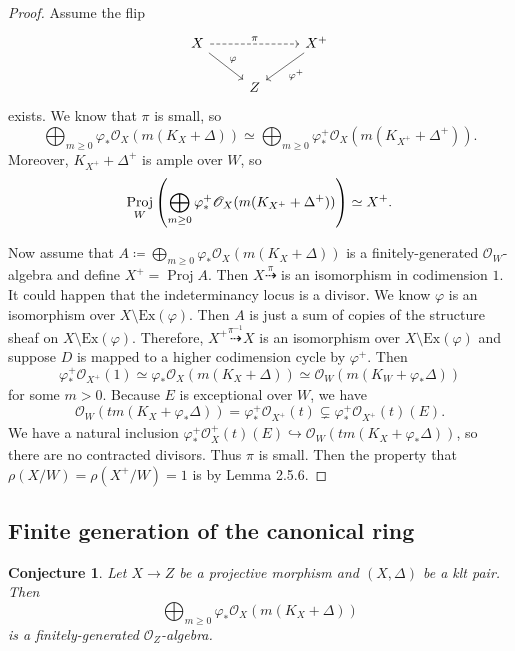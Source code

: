 \documentclass[leqno, openany]{memoir}
\newtheorem{conj}[thm]{Conjecture}
\theoremstyle{definition}
\theoremstyle{remark}
\theoremstyle{plain}
\theoremstyle{definition}
\theoremstyle{remark}
\newcommand{\msc}[1]{\mathscr{#1}}
\newcommand{\mr}[1]{\mathrm{#1}}
\DeclareMathOperator{\Proj}{Proj}
\begin{document}
\begin{proof}
    Assume the flip
    \begin{equation*}
    \begin{tikzcd}
        X \ar[dashrightarrow]{rr}{\pi} \ar{dr}{\varphi} & & X^+ \ar{dl}{\varphi^+} \\
                                                        & Z
    \end{tikzcd}
    \end{equation*}
    exists. We know that $\pi$ is small, so
    \[ \bigoplus_{m \geq 0} \varphi_* \msc{O}_X(m(K_X + \Delta)) \simeq \bigoplus_{m \geq 0} \varphi^+_* \msc{O}_X(m(K_{X^+} + \Delta^+)). \]
    Moreover, $K_{X^+} + \Delta^+$ is ample over $W$, so 
    \[ \Proj_W \qty(\bigoplus_{m \geq 0} \varphi^+_* \msc{O}_X(m(K_{X^+} + \Delta^+))) \simeq X^+. \]

    Now assume that $A \coloneqq \bigoplus_{m \geq 0} \varphi_* \msc{O}_X(m(K_X + \Delta))$ is a finitely-generated $\msc{O}_W$-algebra and define $X^+ = \Proj A$. Then $X \overset{\pi}{\dashrightarrow}$ is an isomorphism in codimension $1$. It could happen that the indeterminancy locus is a divisor. We know $\varphi$ is an isomorphism over $X \setminus \mr{Ex}(\varphi)$. Then $A$ is just a sum of copies of the structure sheaf on $X \setminus \mr{Ex}(\varphi)$. Therefore, $X^+ \overset{\pi^{-1}}{\dashrightarrow} X$ is an isomorphism over $X \setminus \mr{Ex}(\varphi)$ and suppose $D$ is mapped to a higher codimension cycle by $\varphi^+$. Then
    \[ \varphi_*^+ \msc{O}_{X^+}(1) \simeq \varphi_* \msc{O}_X(m(K_X + \Delta)) \simeq \msc{O}_W(m(K_W + \varphi_* \Delta)) \]
    for some $m > 0$. Because $E$ is exceptional over $W$, we have 
    \[ \msc{O}_W(tm(K_X + \varphi_* \Delta)) = \varphi_*^+ \msc{O}_{X^+}(t) \subsetneq \varphi_*^+ \msc{O}_{X^+}(t)(E). \]
    We have a natural inclusion $\varphi_*^+ \msc{O}_X^+(t)(E) \hookrightarrow \msc{O}_W(tm(K_X + \varphi_* \Delta))$, so there are no contracted divisors. Thus $\pi$ is small. Then the property that $\rho(X/W) = \rho(X^+/W) = 1$ is by Lemma 2.5.6.
\end{proof}

\subsection{Finite generation of the canonical ring}%
\label{sub:finite_generation_of_the_canonical_ring}

\begin{conj}
    Let $X \to Z$ be a projective morphism and $(X, \Delta)$ be a klt pair. Then
    \[ \bigoplus_{m \geq 0} \varphi_* \msc{O}_X(m(K_X + \Delta)) \]
    is a finitely-generated $\msc{O}_Z$-algebra.
\end{conj}
\end{document}
